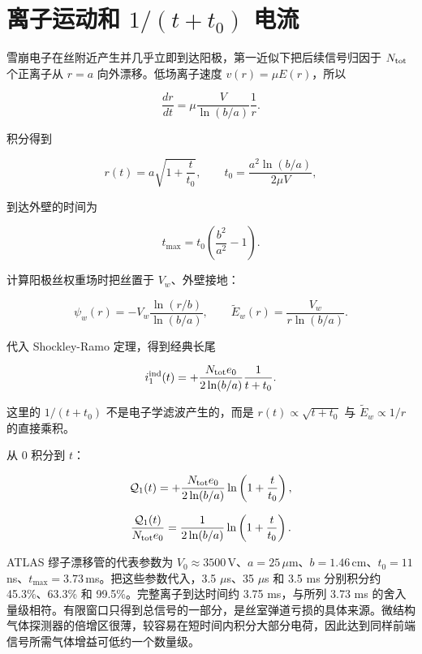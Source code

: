 \documentclass[
  11pt,
  a4paper,
  oneside,
  openany]{report}
\numberwithin{equation}{chapter}
\begin{document}
\section{\texorpdfstring{离子运动和 \(1/(t+t_0)\)
电流}{离子运动和 1/(t+t\_0) 电流}}\label{ux79bbux5b50ux8fd0ux52a8ux548c-1tt_0-ux7535ux6d41}

雪崩电子在丝附近产生并几乎立即到达阳极，第一近似下把后续信号归因于
\(N_{\rm tot}\) 个正离子从 \(r=a\) 向外漂移。低场离子速度
\(v(r)=\mu E(r)\)，所以

\begin{equation}
\frac{dr}{dt}=\mu\frac{V}{\ln(b/a)}\frac{1}{r}.
\end{equation}

积分得到

\begin{equation}
r(t)=a\sqrt{1+\frac{t}{t_0}},
\qquad
t_0=\frac{a^2\ln(b/a)}{2\mu V},
\end{equation}

到达外壁的时间为

\begin{equation}
t_{\max}=t_0\left(\frac{b^2}{a^2}-1\right).
\end{equation}

计算阳极丝权重场时把丝置于 \(V_w\)、外壁接地：

\begin{equation}
\psi_w(r)=-V_w\frac{\ln(r/b)}{\ln(b/a)},
\qquad
\widetilde E_w(r)=\frac{V_w}{r\ln(b/a)}.
\end{equation}

代入 Shockley-Ramo 定理，得到经典长尾

\begin{equation}
i_1^{\rm ind}(t)=+\frac{N_{\rm tot}e_0}{2\ln(b/a)}\frac{1}{t+t_0}.
\end{equation}

这里的 \(1/(t+t_0)\) 不是电子学滤波产生的，而是
\(r(t)\propto\sqrt{t+t_0}\) 与 \(\widetilde E_w\propto1/r\) 的直接乘积。

从 \(0\) 积分到 \(t\)：

\begin{equation}
\mathcal Q_1(t)=+\frac{N_{\rm tot}e_0}{2\ln(b/a)}
\ln\left(1+\frac{t}{t_0}\right),
\end{equation}

\begin{equation}
\frac{\mathcal Q_1(t)}{N_{\rm tot}e_0}
=\frac{1}{2\ln(b/a)}\ln\left(1+\frac{t}{t_0}\right).
\end{equation}

ATLAS 缪子漂移管的代表参数为
\(V_0\approx3500\,\)V、\(a=25\,\mu\)m、\(b=1.46\,\)cm、\(t_0=11\,\)ns、\(t_{\max}=3.73\,\)ms。把这些参数代入，3.5
\(\mu\)s、35 \(\mu\)s 和 3.5 ms 分别积分约 45.3\%、63.3\% 和
99.5\%。完整离子到达时间约 3.75 ms，与所列 3.73 ms
的舍入量级相符。有限窗口只得到总信号的一部分，是丝室弹道亏损的具体来源。微结构气体探测器的倍增区很薄，较容易在短时间内积分大部分电荷，因此达到同样前端信号所需气体增益可低约一个数量级。
\end{document}
